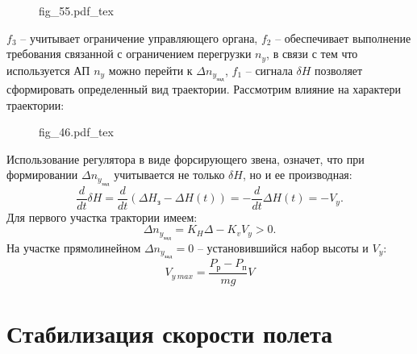 \documentclass{article}
\newcommand{\incfig}[1]{
    {#1.pdf_tex}
}
\begin{document}
\begin{figure}[ht]
	\centering
	\incfig{fig_55}
	\label{fig:fig_55}
\end{figure}

$f_3$ -- учитывает ограничение управляющего органа, $f_2$ -- обеспечивает выполнение требования связанной с ограничением перегрузки $n_y$, в связи с тем что используется АП $n_y$ можно перейти к $ \Delta n_{y_\text{зад}}$, $f_1$ -- сигнала $\delta H$ позволяет сформировать определенный вид траектории. Рассмотрим влияние на характери траектории:

\begin{figure}[ht]
	\centering
	\incfig{fig_46}
	\label{fig:fig_46}
\end{figure}

Использование регулятора в виде форсирующего звена, означет, что при формировании $ \Delta n_{y_\text{зад}}$ учитывается не только $\delta H$, но и ее производная:
\[
	\frac{d}{dt} \delta H = \frac{d}{dt} (\Delta H_\text{з} - \Delta H (t)) = - \frac{d}{dt} \Delta H(t) = -V_y
	.\]
Для первого участка трактории имеем:
\[
	\Delta n_{y_\text{зад}} = K_H \Delta - K_v V_y > 0
	.\]
На участке прямолинейном $ \Delta n_{y_\text{зад}} = 0$ -- установившийся набор высоты и $V_y$:
\[
	V_{y \ max} = \frac{P_\text{р} - P_\text{п}}{mg}V
\]

\section{Стабилизация скорости полета}
\end{document}

